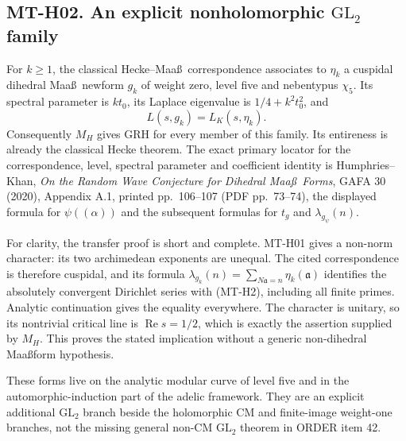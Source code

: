 \documentclass[11pt,a4paper]{article}
\begin{document}
\subsection*{MT-H02. An explicit nonholomorphic \texorpdfstring{$\mathrm{GL}_2$}{GL2} family}
For $k\ge1$, the classical Hecke--Maa\ss\ correspondence associates to
$\eta_k$ a cuspidal dihedral Maa\ss\ newform $g_k$ of weight zero,
level five and nebentypus $\chi_5$. Its spectral parameter is $kt_0$,
its Laplace eigenvalue is $1/4+k^2t_0^2$, and
\[
       L(s,g_k)=L_K(s,\eta_k).
                                                               \tag{MT-H2}
\]
Consequently $M_H$ gives GRH for every member of this family. Its
entireness is already the classical Hecke theorem. The exact primary
locator for the correspondence, level, spectral parameter and coefficient
identity is Humphries--Khan, \emph{On the Random Wave Conjecture for
Dihedral Maa\ss\ Forms}, GAFA 30 (2020), Appendix A.1, printed pp.~106--107 (PDF pp.~73--74), the displayed
formula for $\psi((\alpha))$ and the subsequent formulas for
$t_g$ and $\lambda_{g_\psi}(n)$.

For clarity, the transfer proof is short and complete. MT-H01 gives
a non-norm character: its two archimedean exponents are unequal.
The cited correspondence is therefore cuspidal, and its formula
$\lambda_{g_k}(n)=\sum_{N\mathfrak a=n}\eta_k(\mathfrak a)$ identifies
the absolutely convergent Dirichlet series with (MT-H2), including all
finite primes. Analytic continuation gives the equality everywhere.
The character is unitary, so its nontrivial critical line is
$\operatorname{Re}s=1/2$, which is exactly the assertion supplied by
$M_H$. This proves the stated implication without a generic
non-dihedral Maa\ss\-form hypothesis.

These forms live on the analytic modular curve of level five and in
the automorphic-induction part of the adelic framework. They are an
explicit additional $\mathrm{GL}_2$ branch beside the holomorphic
CM and finite-image weight-one branches, not the missing general
non-CM $\mathrm{GL}_2$ theorem in ORDER item 42.
\end{document}
